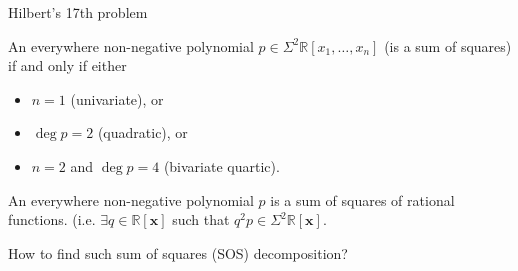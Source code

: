 \documentclass[9pt]{beamer}
\theoremstyle{definition}
\newcommand{\R}{\mathbb{R}}
\begin{document}
\begin{frame}{Hilbert's 17th problem}

\begin{theorem}[Hilbert, 1888]
  An everywhere non-negative polynomial $p\in \Sigma^2\mathbb{R}[x_1,\ldots, x_n]$ (is a sum of squares) if and only if either
  \begin{itemize}
    \item $n = 1$ (univariate), or
    \item $\operatorname{deg}p = 2$ (quadratic), or
    \item $n = 2$ and $\operatorname{deg}p = 4$ (bivariate quartic).
  \end{itemize}

\end{theorem}
\pause
\begin{theorem}[Artin, 1924]
  An everywhere non-negative polynomial $p$ is a sum of squares of rational functions.
  (i.e. $\exists q\in \mathbb{R}[\mathbf{x}]$ such that  $q^2 p \in \Sigma^2\R[\mathbf{x}]$.
\end{theorem}

\begin{problem}
  How to find such sum of squares (SOS) decomposition?
\end{problem}

\end{frame}



\end{document}
